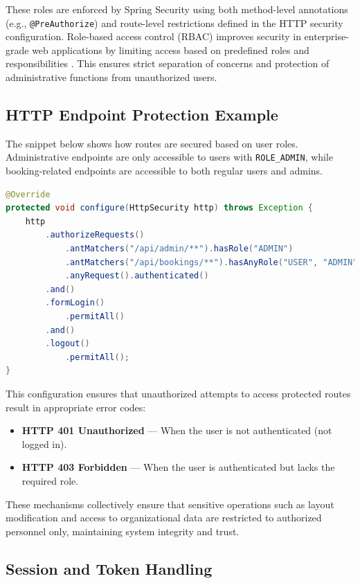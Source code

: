 \documentclass[12pt,a4paper]{report} %
\begin{document}
These roles are enforced by Spring Security using both method-level annotations (e.g., \verb|@PreAuthorize|) and route-level restrictions defined in the HTTP security configuration. Role-based access control (RBAC) improves security in enterprise-grade web applications by limiting access based on predefined roles and responsibilities \cite{patel2020rbac}. This ensures strict separation of concerns and protection of administrative functions from unauthorized users.

\subsection*{HTTP Endpoint Protection Example}

The snippet below shows how routes are secured based on user roles. Administrative endpoints are only accessible to users with \verb|ROLE_ADMIN|, while booking-related endpoints are accessible to both regular users and admins.

\begin{lstlisting}[language=Java, caption=Spring Security Configuration]
@Override
protected void configure(HttpSecurity http) throws Exception {
    http
        .authorizeRequests()
            .antMatchers("/api/admin/**").hasRole("ADMIN")
            .antMatchers("/api/bookings/**").hasAnyRole("USER", "ADMIN")
            .anyRequest().authenticated()
        .and()
        .formLogin()
            .permitAll()
        .and()
        .logout()
            .permitAll();
}
\end{lstlisting}

This configuration ensures that unauthorized attempts to access protected routes result in appropriate error codes:
\begin{itemize}
    \item \textbf{HTTP 401 Unauthorized} — When the user is not authenticated (not logged in).
    \item \textbf{HTTP 403 Forbidden} — When the user is authenticated but lacks the required role.
\end{itemize}

These mechanisms collectively ensure that sensitive operations such as layout modification and access to organizational data are restricted to authorized personnel only, maintaining system integrity and trust.

\subsection{Session and Token Handling}
\end{document}
